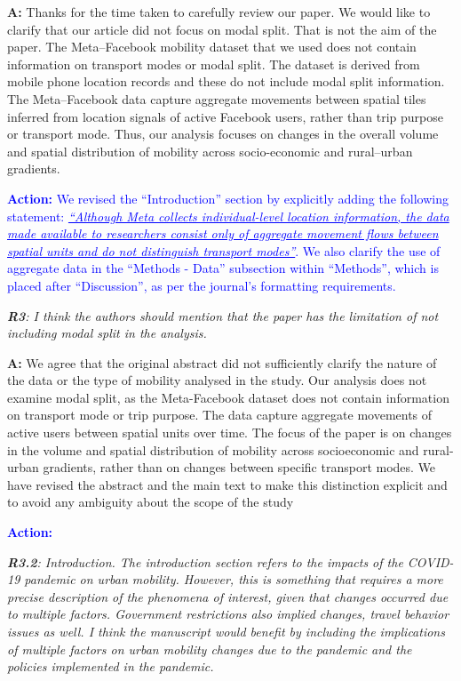 \documentclass[12pt,a4paper,oneside, reqno]{amsart}
\begin{document}
\setlength{\leftskip}{1cm}\textbf{A:} Thanks for the time taken to carefully review our paper. We would like to clarify that our article did not focus on modal split. That is not the aim of the paper. The Meta–Facebook mobility dataset that we used does not contain information on transport modes or modal split. The dataset is derived from mobile phone location records and these do not include modal split information. The Meta–Facebook data capture aggregate movements between spatial tiles inferred from location signals of active Facebook users, rather than trip purpose or transport mode. Thus, our analysis focuses on changes in the overall volume and spatial distribution of mobility across socio-economic and rural–urban gradients.

\textcolor{blue}{
\textbf{Action:} We revised the ``Introduction'' section by explicitly adding the following statement: \textit{\uline{``Although Meta collects individual-level location information, the data made available to researchers consist only of aggregate movement flows between spatial units and do not distinguish transport modes''}}. We also clarify the use of aggregate data in the ``Methods - Data'' subsection within ``Methods'', which is placed after ``Discussion'', as per the journal's formatting requirements. 
}

\setlength{\leftskip}{1cm} \textit{\textbf{R3}: I think the authors should mention that the paper has the limitation of not including modal split in the analysis.}

\setlength{\leftskip}{1cm}\textbf{A:} We agree that the original abstract did not sufficiently clarify the nature of the data or the type of mobility analysed in the study. Our analysis does not examine modal split, as the Meta-Facebook dataset does not contain information on transport mode or trip purpose. The data capture aggregate movements of active users between spatial units over time. The focus of the paper is on changes in the volume and spatial distribution of mobility across socioeconomic and rural-urban gradients, rather than on changes between specific transport modes. We have revised the abstract and the main text to make this distinction explicit and to avoid any ambiguity about the scope of the study 

\textcolor{blue}{\textbf{Action:}}


\setlength{\leftskip}{0cm} \textit{\textbf{R3.2}: Introduction. The introduction section refers to the impacts of the COVID-19 pandemic on urban mobility. However, this is something that requires a more precise description of the phenomena of interest, given that changes occurred due to multiple factors. Government restrictions also implied changes, travel behavior issues as well. I think the manuscript would benefit by including the implications of multiple factors on urban mobility changes due to the pandemic and the policies implemented in the pandemic.}
\end{document}
